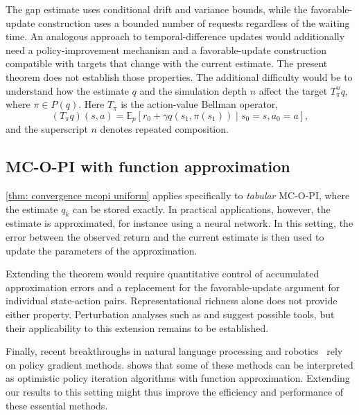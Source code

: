 The gap estimate uses conditional drift and variance bounds, while the favorable-update construction uses a bounded number of requests regardless of the waiting time. An analogous approach to temporal-difference updates would additionally need a policy-improvement mechanism and a favorable-update construction compatible with targets that change with the current estimate. The present theorem does not establish those properties.
The additional difficulty would be to understand how the estimate $q$ and the simulation depth $n$ affect the target $T_{\pi}^n q$, where $\pi \in P(q)$. Here $T_\pi$ is the action-value Bellman operator,
\[
(T_\pi q)(s,a)=\mathbb E_p\!\left[r_0+\gamma q(s_1,\pi(s_1))\mid s_0=s,a_0=a\right],
\]
and the superscript $n$ denotes repeated composition.


%
%
\subsection{MC-O-PI with function approximation}
\label{sec: discussion function approximation}

\autoref{thm: convergence mcopi uniform} applies specifically to \textit{tabular} MC-O-PI, where the estimate $q_k$ can be stored exactly.
In practical applications, however, the estimate is approximated, for instance using a neural network.
In this setting, the error between the observed return and the current estimate is then used to update the parameters of the approximation.
%

Extending the theorem would require quantitative control of accumulated approximation errors and a replacement for the favorable-update argument for individual state-action pairs. Representational richness alone does not provide either property. Perturbation analyses such as \citet[Section~4.3.3]{Bertsekas1996Neuro-DynamicProgramming} and \citet[Section~5.2]{Kushner2003StochasticApplications} suggest possible tools, but their applicability to this extension remains to be established.
%

%
%
%
%


Finally, recent breakthroughs in natural language processing and robotics~\citep{Schulman2017ProximalAlgorithms} rely on policy gradient methods.
\citet{Wagner2013OptimisticResult} shows that some of these methods can be interpreted as optimistic policy iteration algorithms with function approximation.
Extending our results to this setting might thus improve the efficiency and performance of these essential methods.


%

